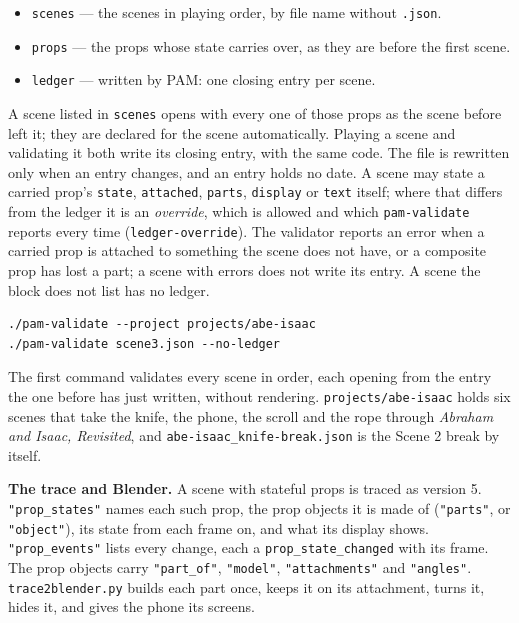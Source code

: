 \documentclass[
  12pt,
  letterpaper,
]{book}
\providecommand{\tightlist}{%
  \setlength{\itemsep}{0pt}\setlength{\parskip}{0pt}}
\begin{document}
\begin{itemize}
\tightlist
\item
  \texttt{scenes} --- the scenes in playing order, by file name
  without \texttt{.json}.
\item
  \texttt{props} --- the props whose state carries over, as they are
  before the first scene.
\item
  \texttt{ledger} --- written by PAM: one closing entry per scene.
\end{itemize}

A scene listed in \texttt{scenes} opens with every one of those props
as the scene before left it; they are declared for the scene
automatically. Playing a scene and validating it both write its
closing entry, with the same code. The file is rewritten only when an
entry changes, and an entry holds no date. A scene may state a carried
prop's \texttt{state}, \texttt{attached}, \texttt{parts},
\texttt{display} or \texttt{text} itself; where that differs from the ledger it is an
\emph{override}, which is allowed and which \texttt{pam-validate}
reports every time (\texttt{ledger-override}). The validator reports an
error when a carried prop is attached to something the scene does not
have, or a composite prop has lost a part; a scene with errors does not
write its entry. A scene the block does not list has no ledger.

\begin{verbatim}
./pam-validate --project projects/abe-isaac
./pam-validate scene3.json --no-ledger
\end{verbatim}

The first command validates every scene in order, each opening from the
entry the one before has just written, without rendering.
\texttt{projects/abe-isaac} holds six scenes that take the knife, the
phone, the scroll and the rope through \emph{Abraham and Isaac,
Revisited}, and \texttt{abe-isaac\_knife-break.json} is the Scene 2
break by itself.

\textbf{The trace and Blender.} A scene with stateful props is traced
as version 5. \texttt{"prop\_states"} names each such prop, the prop
objects it is made of (\texttt{"parts"}, or \texttt{"object"}), its
state from each frame on, and what its display shows.
\texttt{"prop\_events"} lists every change, each a
\texttt{prop\_state\_changed} with its frame. The prop objects carry
\texttt{"part\_of"}, \texttt{"model"}, \texttt{"attachments"} and
\texttt{"angles"}. \texttt{trace2blender.py} builds each part once,
keeps it on its attachment, turns it, hides it, and gives the phone its
screens.
\end{document}

